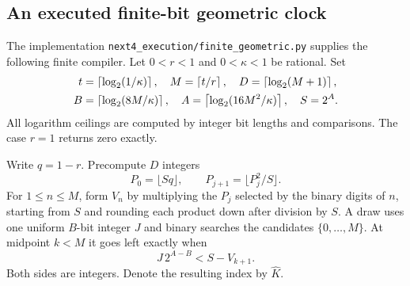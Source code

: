 \subsection{An executed finite-bit geometric clock}
The implementation \texttt{next4\_execution/finite\_geometric.py} supplies
the following finite compiler. Let $0<r<1$ and $0<\kappa<1$ be rational.
Set
\begin{align*}
t&=\left\lceil\log_2(1/\kappa)\right\rceil,\quad M=\left\lceil t/r\right\rceil,\quad
D=\left\lceil\log_2(M+1)\right\rceil,\\
B&=\left\lceil\log_2(8M/\kappa)\right\rceil,\quad
A=\left\lceil\log_2(16M^2/\kappa)\right\rceil,\quad S=2^A .
\end{align*}
All logarithm ceilings are computed by integer bit lengths and comparisons.
The case $r=1$ returns zero exactly.

Write $q=1-r$. Precompute $D$ integers
\[
P_0=\lfloor Sq\rfloor,\qquad
P_{j+1}=\lfloor P_j^2/S\rfloor .
\]
For $1\le n\le M$, form $V_n$ by multiplying the $P_j$ selected by the
binary digits of $n$, starting from $S$ and rounding each product down
after division by $S$. A draw uses one uniform $B$-bit integer $J$ and
binary searches the candidates $\{0,\ldots,M\}$. At midpoint $k<M$ it
goes left exactly when
\[
J\,2^{A-B}<S-V_{k+1}.
\]
Both sides are integers. Denote the resulting index by $\widehat K$.

